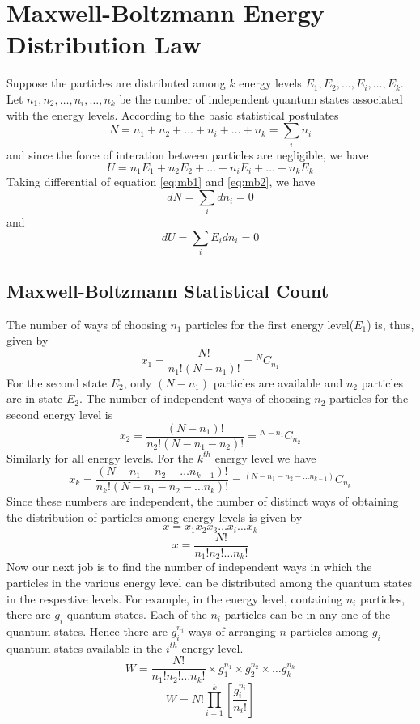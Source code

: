 \documentclass{article}
\numberwithin{equation}{section}
\begin{document}
\section{Maxwell-Boltzmann Energy Distribution Law}
Suppose the particles are distributed among $k$ energy levels $E_1,E_2,\dots,E_i,\dots,E_k$. Let $n_1,n_2,\dots,n_i,\dots,n_k$ be the number of independent quantum states associated with the energy levels. According to the basic statistical postulates
\begin{equation}
  N = n_1 + n_2 + \dots + n_i + \dots + n_k = \sum_i n_i \label{eq:mb1}
\end{equation}
and since the force of interation between particles are negligible, we have
\begin{equation}
  U = n_1 E_1 + n_2 E_2 + \dots + n_i E_i + \dots + n_k E_k \label{eq:mb2}
\end{equation}
Taking differential of equation \eqref{eq:mb1} and \eqref{eq:mb2}, we have
\begin{equation}
  dN = \sum_i dn_i = 0 \label{eq:mb3}
\end{equation}
and
\begin{equation}
  dU = \sum_i E_i dn_i = 0 \label{eq:mb4}
\end{equation}
\subsection{Maxwell-Boltzmann Statistical Count}
The number of ways of choosing $n_1$ particles for the first energy level($E_1$) is, thus, given by
$$x_1 = \frac{N!}{n_1!(N-n_1)!} = {}^NC_{n_1}$$
For the second state $E_2$, only $(N-n_1)$ particles are available and $n_2$ particles are in state $E_2$. The number of independent ways of choosing $n_2$ particles for the second energy level is
$$x_2 = \frac{(N-n_1)!}{n_2! (N-n_1-n_2)!} = {}^{N-n_1}C_{n_2}$$
Similarly for all energy levels. For the $k^{th}$ energy level we have
$$x_k = \frac{(N-n_1-n_2-\dots n_{k-1})!}{n_k! (N-n_1-n_2-\dots n_k)!} = {}^{(N-n_1-n_2-\dots n_{k-1})} C_{n_k}$$
Since these numbers are independent, the number of distinct ways of obtaining the distribution of particles among energy levels is given by
$$x = x_1 x_2 x_3 \dots x_i \dots x_k$$
\begin{equation}
  x = \frac{N!}{n_1! n_2! \dots n_k!} \label{eq:mb5}
\end{equation}
Now our next job is to find the number of independent ways in which the particles in the various energy level can be distributed among the quantum states in the respective levels. For example, in the energy level, containing $n_i$ particles, there are $g_i$ quantum states. Each of the $n_i$ particles can be in any one of the quantum states. Hence there are $g_i^{n_i}$ ways of arranging $n$ particles among $g_i$ quantum states available in the $i^{th}$ energy level.
$$W = \frac{N!}{n_1! n_2! \dots n_k!} \times g_1^{n_1} \times g_2^{n_2} \times \dots g_k^{n_k}$$
\begin{equation}
  W = N! \prod_{i=1}^{k} \left[\frac{g_i^{n_i}}{n_i!}\right] \label{eq:mb6}
\end{equation}
\end{document}
